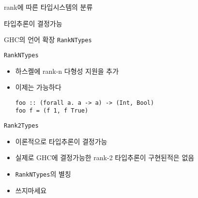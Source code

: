 \documentclass{beamer}
\begin{document}
\begin{frame} {rank에 따른 타입시스템의 분류}
  \pause
  \alert<2>{타입추론이 결정가능}
\end{frame}

\begin{frame}[fragile] {GHC의 언어 확장 \texttt{RankNTypes}}
  \begin{block} {\texttt{RankNTypes}}
    \begin{itemize}
      \item 하스켈에 rank-n 다형성 지원을 추가\\
      \pause
      \item 이제는 가능하다
\begin{verbatim}
foo :: (forall a. a -> a) -> (Int, Bool)
foo f = (f 1, f True)
\end{verbatim}
    \end{itemize}
  \end{block}
  \pause
  \begin{block} {\texttt{Rank2Types}}
    \begin{itemize}
      \item 이론적으로 타입추론이 결정가능
      \item 실제로 GHC에 결정가능한 rank-2 타입추론이 구현된적은 없음
      \pause
      \item \texttt{RankNTypes}의 별칭
      \item 쓰지마세요
    \end{itemize}
  \end{block}
\end{frame}
\end{document}
